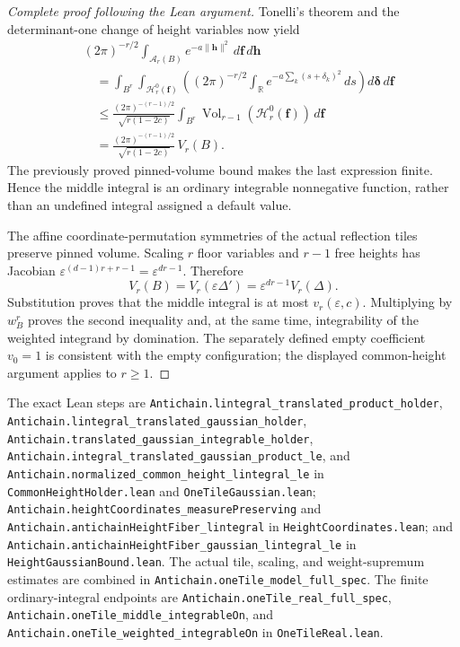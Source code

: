 \begin{proof}[Complete proof following the Lean argument]
Tonelli's theorem and the determinant-one change of height variables
now yield
\[
 \begin{aligned}
 &(2\pi)^{-r/2}\int_{\mathcal A_r(B)}
                  e^{-a\|\mathbf h\|^2}\,d\mathbf f\,d\mathbf h\\
 &\quad=
   \int_{B^r}\int_{\mathcal H_r^0(\mathbf f)}
       \left((2\pi)^{-r/2}\int_{\mathbb R}
          e^{-a\sum_k(s+\delta_k)^2}\,ds\right)
       d\boldsymbol\delta\,d\mathbf f\\
 &\quad\le
   \frac{(2\pi)^{-(r-1)/2}}{\sqrt{r(1-2c)}}
   \int_{B^r}\operatorname{Vol}_{r-1}
                       (\mathcal H_r^0(\mathbf f))\,d\mathbf f\\
 &\quad=
   \frac{(2\pi)^{-(r-1)/2}}{\sqrt{r(1-2c)}}\,V_r(B).
 \end{aligned}
\]
The previously proved pinned-volume bound makes the last expression
finite. Hence the middle integral is an ordinary integrable
nonnegative function, rather than an undefined integral assigned a
default value.

The affine coordinate-permutation symmetries of the actual reflection
tiles preserve pinned volume. Scaling \(r\) floor variables and \(r-1\)
free heights has Jacobian
\(\varepsilon^{(d-1)r+r-1}=\varepsilon^{dr-1}\). Therefore
\[
 V_r(B)=V_r(\varepsilon\Delta')
       =\varepsilon^{dr-1}V_r(\Delta).
\]
Substitution proves that the middle integral is at most
\(v_r(\varepsilon,c)\). Multiplying by \(w_B^r\) proves the second
inequality and, at the same time, integrability of the weighted
integrand by domination. The separately defined empty coefficient
\(v_0=1\) is consistent with the empty configuration; the displayed
common-height argument applies to \(r\ge1\).
\end{proof}

\begingroup\small\raggedright
The exact Lean steps are
\nolinkurl{Antichain.lintegral_translated_product_holder},
\nolinkurl{Antichain.lintegral_translated_gaussian_holder},
\nolinkurl{Antichain.translated_gaussian_integrable_holder},
\nolinkurl{Antichain.integral_translated_gaussian_product_le}, and
\nolinkurl{Antichain.normalized_common_height_lintegral_le}
in \nolinkurl{CommonHeightHolder.lean} and
\nolinkurl{OneTileGaussian.lean};
\nolinkurl{Antichain.heightCoordinates_measurePreserving} and
\nolinkurl{Antichain.antichainHeightFiber_lintegral}
in \nolinkurl{HeightCoordinates.lean};
and \nolinkurl{Antichain.antichainHeightFiber_gaussian_lintegral_le}
in \nolinkurl{HeightGaussianBound.lean}.
The actual tile, scaling, and weight-supremum estimates are combined in
\nolinkurl{Antichain.oneTile_model_full_spec}.
The finite ordinary-integral endpoints are
\nolinkurl{Antichain.oneTile_real_full_spec},
\nolinkurl{Antichain.oneTile_middle_integrableOn}, and
\nolinkurl{Antichain.oneTile_weighted_integrableOn}
in \nolinkurl{OneTileReal.lean}.
\par\endgroup

